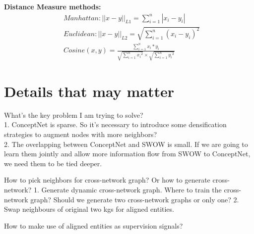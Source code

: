     
\noindent\textbf{Distance Measure methods:}
\begin{align}
    & Manhattan: \big |\big|x -y \big |\big|_{L1} = \sum_{i=1}^{n} |x_i-y_i| \\
    & Euclidean:  \big |\big|x -y \big |\big|_{L2} = \sqrt{\sum\limits_{i=1}^{n} (x_i - y_i)^2} \\
    & Cosine(x,y) =  \frac{\sum_{i=1}^{n}x_i*y_i}{\sqrt{\sum_{i=1}^{n}{x_i}^2} \times \sqrt{\sum_{i=1}^{n}{y_i}^2}}  
\end{align}



\section{Details that may matter}

What's the key problem I am trying to solve?  \\
1. ConceptNet is sparse. So it's necessary to introduce some densification strategies to augment nodes with more neighbors?\\
2. The overlapping between ConceptNet and SWOW is small. If we are going to learn them jointly and allow more information flow from SWOW to ConceptNet, we need them to be tied deeper. 


How to pick neighbors for cross-network graph? Or how to generate cross-network?
 1. Generate dynamic cross-network graph.
 Where to train the cross-network graph? 
 Should we generate two cross-network graphs or only one?
 2. Swap neighbours of original two kgs for aligned entities.  
 
How to make use of aligned entities as supervision signals? 




